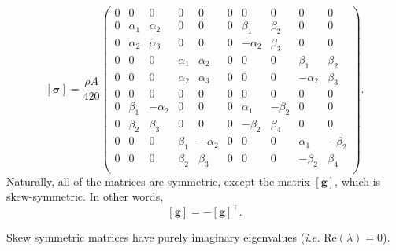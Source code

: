 \[
\mathbf{[\sigma]} = 
\frac{\rho A}{420}\begin{pmatrix}
 0 & 0 &  0 & 0 &  0 & 0 & 0 & 0 & 0 &  0\\
 0 & \alpha_1 & \alpha_2 & 0 &  0 & 0 &  \beta_1  & \beta_2 & 0 & 0\\
 0 & \alpha_2 & \alpha_3 & 0 &  0 & 0 & -\alpha_2 & \beta_3 & 0 & 0\\
 0 & 0 & 0 & \alpha_1 & \alpha_2 & 0 & 0 & 0 &  \beta_1  & \beta_2 \\
 0 & 0 & 0 & \alpha_2 & \alpha_3 & 0 & 0 & 0 & -\alpha_2 & \beta_3\\
 0 & 0 & 0 & 0 & 0 & 0 & 0 & 0 & 0 & 0\\
 0 & \beta_1 & -\alpha_2 & 0 & 0 & 0 & \alpha_1 & -\beta_2 & 0 & 0\\
 0 & \beta_2 & \beta_3 & 0 & 0 & 0 & -\beta_2 & \beta_4 & 0 & 0\\
 0 & 0 & 0 & \beta_1 & -\alpha_2 & 0 & 0 & 0 & \alpha_1 & -\beta_2\\
 0 & 0 & 0 & \beta_2 &  \beta_3  & 0 & 0 & 0 & -\beta_2 &  \beta_4\\
\end{pmatrix}.
\]
Naturally, all of the matrices are symmetric, except the matrix $\mathbf{[g]}$, which is skew-symmetric. In other words, 
\begin{equation}
\mathbf{[g]} = -\mathbf{[g]}^\top.
\end{equation}
\begin{lemma}
Skew symmetric matrices have purely imaginary eigenvalues (\emph{i.e.} $\text{Re}(\lambda)=0$). 
\end{lemma}

